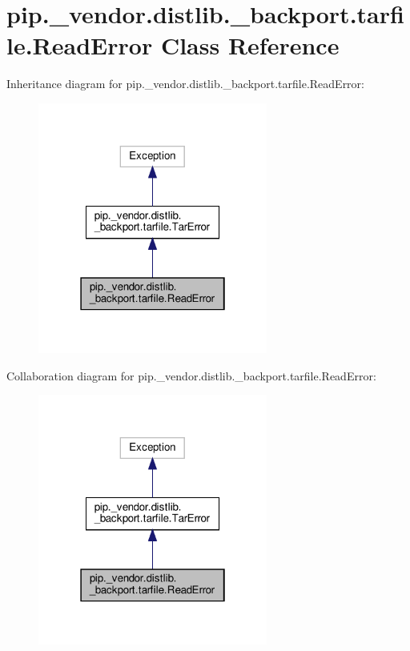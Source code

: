 \hypertarget{classpip_1_1__vendor_1_1distlib_1_1__backport_1_1tarfile_1_1ReadError}{}\section{pip.\+\_\+vendor.\+distlib.\+\_\+backport.\+tarfile.\+Read\+Error Class Reference}
\label{classpip_1_1__vendor_1_1distlib_1_1__backport_1_1tarfile_1_1ReadError}


Inheritance diagram for pip.\+\_\+vendor.\+distlib.\+\_\+backport.\+tarfile.\+Read\+Error\+:
\nopagebreak
\begin{figure}[H]
\begin{center}
\leavevmode
\includegraphics[width=214pt]{classpip_1_1__vendor_1_1distlib_1_1__backport_1_1tarfile_1_1ReadError__inherit__graph}
\end{center}
\end{figure}


Collaboration diagram for pip.\+\_\+vendor.\+distlib.\+\_\+backport.\+tarfile.\+Read\+Error\+:
\nopagebreak
\begin{figure}[H]
\begin{center}
\leavevmode
\includegraphics[width=214pt]{classpip_1_1__vendor_1_1distlib_1_1__backport_1_1tarfile_1_1ReadError__coll__graph}
\end{center}
\end{figure}


